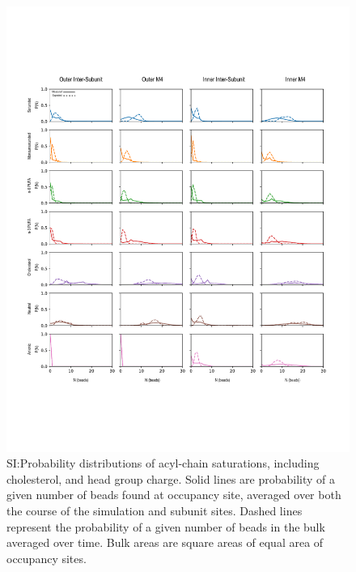 \documentclass[preprint,3p,9pt,times,onecolumn]{elsarticle}
\begin{document}
\begin{figure}[!h]
	\center
	\includegraphics[width=\linewidth]{Bead_Distributions.pdf}
	\caption{SI:Probability distributions of acyl-chain saturations, including cholesterol, and head group charge. Solid lines are probability of a given number of beads found at occupancy site, averaged over both the course of the simulation and subunit sites. Dashed lines represent the probability of a given number of beads in the bulk averaged over time. Bulk areas are square areas of equal area of occupancy sites.}
	\label{fig:lipidDist}
\end{figure}
\end{document}
